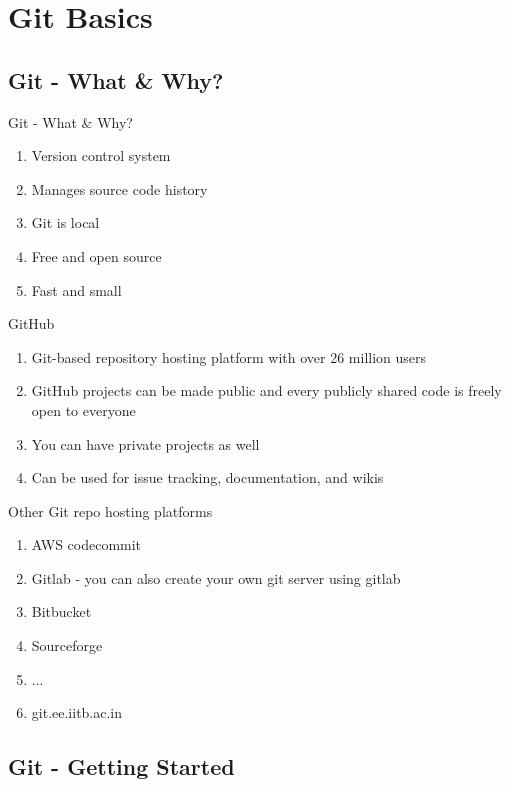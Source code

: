 \documentclass{beamer}
\begin{document}
\section{Git Basics}
{
\subsection{Git - What \& Why?}

\begin{frame}{Git - What \& Why?}
	\begin{enumerate}
		\item<2-> Version control system
		\item<2-> Manages source code history
		\item<2-> Git is local
		\item<3-> Free and open source
		\item<3-> Fast and small		
	\end{enumerate}
\end{frame}

\begin{frame}{GitHub}
	\begin{enumerate}
		\item<2-> Git-based repository hosting platform with over 26 million users
		\item<3-> GitHub projects can be made public and every publicly shared code is freely open to everyone
		\item<4-> You can have private projects as well
		\item<5-> Can be used for issue tracking, documentation, and wikis
	\end{enumerate}
\end{frame}

\begin{frame}{Other Git repo hosting platforms}
	\begin{enumerate}
		\item AWS codecommit
		\item Gitlab - you can also create your own git server using gitlab
		\item Bitbucket
		\item Sourceforge
		\item ...
		\item git.ee.iitb.ac.in 
	\end{enumerate}
\end{frame}

\subsection{Git - Getting Started}

}
\end{document}
